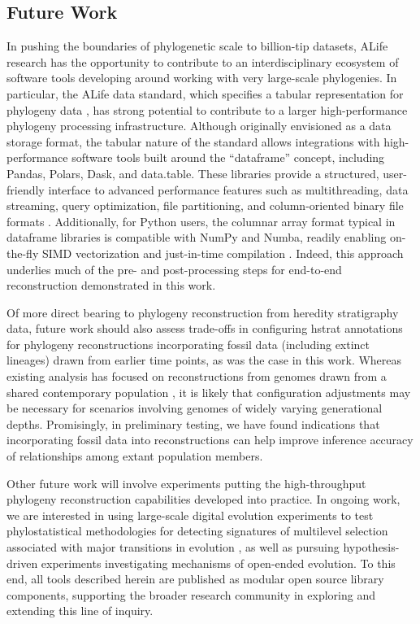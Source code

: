 \subsection{Future Work}

In pushing the boundaries of phylogenetic scale to billion-tip datasets, ALife research has the opportunity to contribute to an interdisciplinary ecosystem of software tools developing around working with very large-scale phylogenies.
In particular, the ALife data standard, which specifies a tabular representation for phylogeny data \citep{Lalejini2019data}, has strong potential to contribute to a larger high-performance phylogeny processing infrastructure.
Although originally envisioned as a data storage format, the tabular nature of the standard allows integrations with high-performance software tools built around the ``dataframe'' concept, including Pandas, Polars, Dask, and data.table.
These libraries provide a structured, user-friendly interface to advanced performance features such as multithreading, data streaming, query optimization, file partitioning, and column-oriented binary file formats \citep{mckinney2010data,datatable,vink2024polars,rocklin2015dask}.
Additionally, for Python users, the columnar array format typical in dataframe libraries is compatible with NumPy and Numba, readily enabling on-the-fly SIMD vectorization and just-in-time compilation \citep{harris2020array,lam2015numba}.
Indeed, this approach underlies much of the pre- and post-processing steps for end-to-end reconstruction demonstrated in this work.

Of more direct bearing to phylogeny reconstruction from heredity stratigraphy data, future work should also assess trade-offs in configuring hstrat annotations for phylogeny reconstructions incorporating fossil data (including extinct lineages) drawn from earlier time points, as was the case in this work.
Whereas existing analysis has focused on reconstructions from genomes drawn from a shared contemporary population \citep{moreno2025testing}, it is likely that configuration adjustments may be necessary for scenarios involving genomes of widely varying generational depths.
Promisingly, in preliminary testing, we have found indications that incorporating fossil data into reconstructions can help improve inference accuracy of relationships among extant population members.

Other future work will involve experiments putting the high-throughput phylogeny reconstruction capabilities developed into practice.
In ongoing work, we are interested in using large-scale digital evolution experiments to test phylostatistical methodologies for detecting signatures of multilevel selection associated with major transitions in evolution \citep{BonettiFranceschi2024}, as well as pursuing hypothesis-driven experiments investigating mechanisms of open-ended evolution.
To this end, all tools described herein are published as modular open source library components, supporting the broader research community in exploring and extending this line of inquiry.
